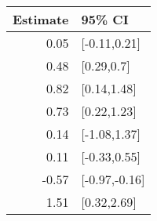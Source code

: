 \begin{tabular}{rl}
  \hline
Estimate & 95\% CI \\ 
  \hline
0.05 & [-0.11,0.21] \\ 
  0.48 & [0.29,0.7] \\ 
  0.82 & [0.14,1.48] \\ 
  0.73 & [0.22,1.23] \\ 
  0.14 & [-1.08,1.37] \\ 
  0.11 & [-0.33,0.55] \\ 
  -0.57 & [-0.97,-0.16] \\ 
  1.51 & [0.32,2.69] \\ 
   \hline
\end{tabular}

